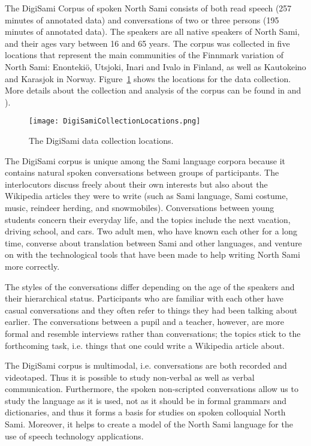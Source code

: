 \documentclass[runningheads,a4paper]{llncs}
\begin{document}
The DigiSami Corpus of spoken North Sami consists of both read speech (257 minutes of annotated data) and conversations of two or three persons (195 minutes of annotated data). The speakers are all native speakers of North Sami, and their ages vary between 16 and 65 years. The corpus was collected in five locations that represent the main communities of the Finnmark variation of North Sami:
Enonteki\"{o}, Utsjoki, Inari and Ivalo in Finland, as well as Kautokeino and Karasjok in Norway. Figure~\ref{fig:data-locations} shows the locations for the data collection. More details about the collection and analysis of the corpus can be found in \cite{Jokinen:Wilcock:SLTU:14} and \cite{Jokinen:LREC:14}).

\begin{figure}[t]
\centering
\texttt{[image: DigiSamiCollectionLocations.png]}
\caption{The DigiSami data collection locations.}
\label{fig:data-locations}
\end{figure}

The DigiSami corpus is unique among the Sami language corpora because it contains natural spoken conversations between groups of participants. The interlocutors discuss freely about their own interests but also about the Wikipedia articles they were to write (such as Sami language, Sami costume, music, reindeer herding, and snowmobiles). Conversations between young students concern their everyday life, and the topics include the next vacation, driving school, and cars. Two adult men, who have known each other for a long time, converse about translation between Sami and other languages, and venture on with the technological tools that have been made to help writing North Sami more correctly.

The styles of the conversations differ depending on the age of the speakers and their hierarchical status. Participants who are familiar with each other have casual conversations and they often refer to things they had been talking about earlier. The conversations between a pupil and a teacher, however, are more formal and resemble interviews rather than conversations; the topics stick to the forthcoming task, i.e. things that one could write a Wikipedia article about.

The DigiSami corpus is multimodal, i.e. conversations are both recorded and videotaped. Thus it is possible to study non-verbal as well as verbal communication. Furthermore, the spoken non-scripted conversations allow us to study the language as it is used, not as it should be in formal grammars and dictionaries, and thus it forms a basis for studies on spoken colloquial North Sami. Moreover, it helps to create a model of the North Sami language for the use of speech technology applications.
\end{document}
